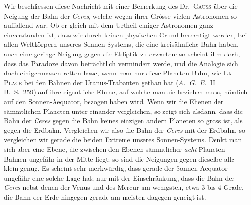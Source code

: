 \par\indent Wir beschliessen diese Nachricht mit einer Bemerkung des Dr.\ \textsc{Gauss} über die Neigung der Bahn der \textit{Ceres}, welche wegen ihrer Grösse vielen Astronomen so auffallend war. Ob er gleich mit dem Urtheil einiger Astronomen ganz einverstanden ist, dass wir durch keinen physischen Grund berechtigt werden, bei allen Weltkörpern unseres Sonnen-Systems, die eine kreisähnliche Bahn haben, auch eine geringe Neigung gegen die Ekliptik zu erwarten: so scheint ihm doch, dass das Paradoxe davon beträchtlich vermindert werde, und die Analogie sich doch einigermassen retten lasse, wenn man nur diese Planeten-Bahn, wie \textsc{La Place} bei den Bahnen der Uranus-Trabanten gethan hat (\textit{A.\ G.\ E.}\ II B.\ S.\ 259) auf ihre eigentliche Ebene, auf welche man sie beziehen muss, nämlich auf den Sonnen-Aequator, bezogen haben wird. Wenn wir die Ebenen der sämmtlichen Planeten unter einander vergleichen, so zeigt sich alsdann, dass die Bahn der \textit{Ceres} gegen die Bahn keines einzigen andern Planeten so gross ist, als gegen die Erdbahn. Vergleichen wir also die Bahn der \textit{Ceres} mit der Erdbahn, so vergleichen wir gerade die beiden Extreme unseres Sonnen-Systems. Denkt man sich aber eine Ebene, die zwischen den Ebenen sämmtlicher \textit{acht} Planeten-Bahnen ungefähr in der Mitte liegt: so sind die Neigungen gegen dieselbe alle klein genug. Es scheint sehr merkwürdig, dass gerade der Sonnen-Aequator ungefähr eine solche Lage hat; nur mit der Einschränkung, dass die Bahn der \textit{Ceres} nebst denen der Venus und des Mercur am wenigsten, etwa 3 bis 4 Grade, die Bahn der Erde hingegen gerade am meisten dagegen geneigt ist.
\begin{flushright}\end{flushright}

